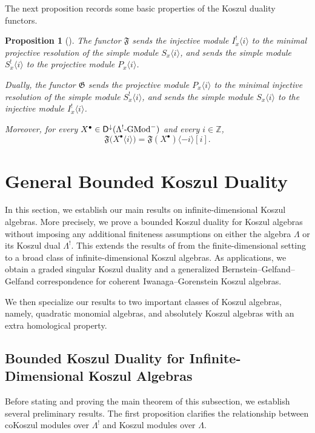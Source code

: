 \documentclass[11pt]{article}
\newtheorem{proposition}[theorem]{Proposition}
\theoremstyle{definition}
\theoremstyle{remark}
\begin{document}
The next proposition records some basic properties of the Koszul duality functors.

\begin{proposition}[{\cite[Lemma~5.10]{11}}]
The functor \(\mathfrak{F}\) sends the injective module
\(I^{!}_{x}\langle i\rangle\)
to the minimal projective resolution of the simple module
\(S_{x}\langle i\rangle\),
and sends the simple module
\(S^{!}_{x}\langle i\rangle\)
to the projective module
\(P_{x}\langle i\rangle\).

Dually, the functor \(\mathfrak{G}\) sends the projective module
\(P_{x}\langle i\rangle\)
to the minimal injective resolution of the simple module
\(S^{!}_{x}\langle i\rangle\),
and sends the simple module
\(S_{x}\langle i\rangle\)
to the injective module
\(I^{!}_{x}\langle i\rangle\).

Moreover, for every
\(
X^\bullet \in
\mathsf{D}^{\downarrow}
(\Lambda^{!}\textup{-GMod}^{-})
\)
and every \(i\in\mathbb Z\), 
\[
\mathfrak{F}\bigl(X^\bullet\langle i\rangle\bigr)
=
\mathfrak{F}(X^\bullet)\langle -i\rangle[i].
\]
\end{proposition}
\section{General Bounded Koszul Duality}
In this section, we establish our main results on infinite-dimensional Koszul algebras. More precisely, we prove a bounded Koszul duality for Koszul algebras without imposing any additional finiteness assumptions on either the algebra \(\Lambda\) or its Koszul dual \(\Lambda^{!}\). This extends the results of \cite{8} from the finite-dimensional setting to a broad class of infinite-dimensional Koszul algebras. As applications, we obtain a graded singular Koszul duality and a generalized Bernstein--Gelfand--Gelfand correspondence for coherent Iwanaga--Gorenstein Koszul algebras.

We then specialize our results to two important classes of Koszul algebras, namely, quadratic monomial algebras, and absolutely Koszul algebras with an extra homological property.
\subsection{Bounded Koszul Duality for Infinite-Dimensional Koszul Algebras}
Before stating and proving the main theorem of this subsection, we establish several preliminary results. The first proposition clarifies the relationship between coKoszul modules over \(\Lambda^{!}\) and Koszul modules over \(\Lambda\).
\end{document}

